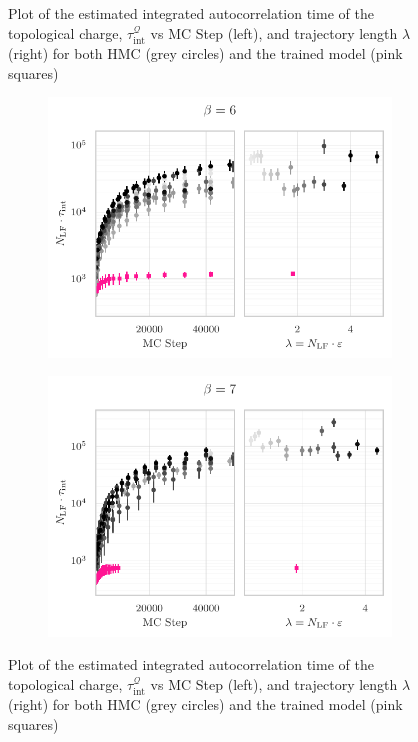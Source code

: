 \documentclass{article} %
\begin{document}
{\begin{figure}[htpb]
\begin{subfigure}{0.4\textwidth}
   \end{subfigure}
   \caption{\label{fig:autocorrbeta45}Plot of the estimated integrated autocorrelation time of the topological charge,
      \(\tau_{\mathrm{int}}^{\mathcal{Q}}\) vs MC Step (left), and trajectory length \(\lambda\) (right) for both HMC
   (grey circles) and the trained model (pink squares)}
\end{figure}
%
\begin{figure}[htpb]
   \centering
   \begin{subfigure}{0.4\textwidth}
      \includegraphics[width=\textwidth]{figures/autocorr_plots_2021_03_09/autocorr_vs_traj_len_2152_b6.pdf}
   \end{subfigure}
   \begin{subfigure}{0.4\textwidth}
      \includegraphics[width=\textwidth]{figures/autocorr_plots_2021_03_09/autocorr_vs_traj_len_2152_b7.pdf}
   \end{subfigure}
   \caption{\label{fig:autocorrbeta67}Plot of the estimated integrated autocorrelation time of the topological charge,
      \(\tau_{\mathrm{int}}^{\mathcal{Q}}\) vs MC Step (left), and trajectory length \(\lambda\) (right) for both HMC
   (grey circles) and the trained model (pink squares)}
\end{figure}
%
%
}
\end{document}
